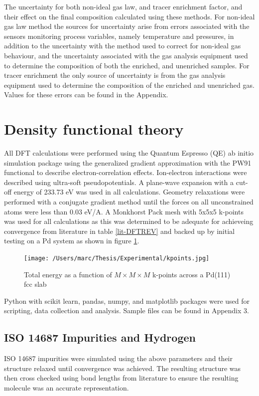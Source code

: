 The uncertainty for both non-ideal gas law, and tracer enrichment factor, and their effect on the final composition calculated using these methods. For non-ideal gas law method the sources for uncertainty arise from errors associated with the sensors monitoring process variables, namely temperature and pressures, in addition to the uncertainty with the method used to correct for non-ideal gas behaviour, and the uncertainty associated with the gas analysis equipment used to determine the composition of both the enriched, and unenriched samples. For tracer enrichment the only source of uncertainty is from the gas analysis equipment used to determine the composition of the enriched and unenriched gas. Values for these errors can be found in the Appendix. 

\section{Density functional theory} \label{DFTparams}
All DFT calculations were performed using the Quantum Espresso (QE) \cite{QE-2009, QE-2017, doi:10.1063/5.0005082} ab initio simulation package using the generalized gradient approximation with the PW91 functional to describe electron-correlation effects. Ion-electron interactions were described using ultra-soft pseudopotentials. A plane-wave expansion with a cut-off energy of 233.73 eV was used in all calculations. Geometry relaxations were performed with a conjugate gradient method until the forces on all unconstrained atoms were less than 0.03 eV/A. A Monkhorst Pack mesh with 5x5x5 k-points was used for all calculations as this was determined to be adequate for achieveing convergence from literature in table \ref{lit-DFTREV} and backed up by initial testing on a Pd system as shown in figure \ref{kpoints}.

\begin{figure}
  \centering
  \texttt{[image: /Users/marc/Thesis/Experimental/kpoints.jpg]}
  \caption{Total energy as a function of $M\times M\times M$ k-points across a Pd(111) fcc slab}
  \label{kpoints}
\end{figure}

Python with scikit learn, pandas, numpy, and matplotlib packages were used for scripting, data collection and analysis. Sample files can be found in Appendix 3. 

\subsection{ISO 14687 Impurities and Hydrogen} \label{gassim}
ISO 14687 impurities were simulated using the above parameters and their structure relaxed until convergence was achieved. The resulting structure was then cross checked using bond lengths from literature to ensure the resulting molecule was an accurate representation. 

